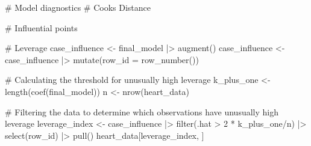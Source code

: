 \documentclass[
  letterpaper,
  DIV=11,
  numbers=noendperiod]{scrartcl}
\newenvironment{Shaded}{\begin{snugshade}}{\end{snugshade}}
\newcommand{\AttributeTok}[1]{\textcolor[rgb]{0.40,0.45,0.13}{#1}}
\newcommand{\CommentTok}[1]{\textcolor[rgb]{0.37,0.37,0.37}{#1}}
\newcommand{\DecValTok}[1]{\textcolor[rgb]{0.68,0.00,0.00}{#1}}
\newcommand{\FunctionTok}[1]{\textcolor[rgb]{0.28,0.35,0.67}{#1}}
\newcommand{\NormalTok}[1]{\textcolor[rgb]{0.00,0.23,0.31}{#1}}
\newcommand{\OtherTok}[1]{\textcolor[rgb]{0.00,0.23,0.31}{#1}}
\newcommand{\SpecialCharTok}[1]{\textcolor[rgb]{0.37,0.37,0.37}{#1}}
\begin{document}
\begin{Shaded}
\begin{Highlighting}[]
\CommentTok{\# Model diagnostics}
\CommentTok{\# Cooks Distance}


\CommentTok{\# Influential points}

\CommentTok{\# Leverage}
\NormalTok{case\_influence }\OtherTok{\textless{}{-}}\NormalTok{ final\_model }\SpecialCharTok{|\textgreater{}} \FunctionTok{augment}\NormalTok{()}
\NormalTok{case\_influence }\OtherTok{\textless{}{-}}\NormalTok{ case\_influence }\SpecialCharTok{|\textgreater{}} \FunctionTok{mutate}\NormalTok{(}\AttributeTok{row\_id =} \FunctionTok{row\_number}\NormalTok{())}

\CommentTok{\# Calculating the threshold for unusually high leverage}
\NormalTok{k\_plus\_one }\OtherTok{\textless{}{-}} \FunctionTok{length}\NormalTok{(}\FunctionTok{coef}\NormalTok{(final\_model))}
\NormalTok{n }\OtherTok{\textless{}{-}} \FunctionTok{nrow}\NormalTok{(heart\_data)}

\CommentTok{\# Filtering the data to determine which observations have unusually high leverage}
\NormalTok{leverage\_index }\OtherTok{\textless{}{-}}\NormalTok{ case\_influence }\SpecialCharTok{|\textgreater{}} \FunctionTok{filter}\NormalTok{(.hat }\SpecialCharTok{\textgreater{}} \DecValTok{2} \SpecialCharTok{*}\NormalTok{ k\_plus\_one}\SpecialCharTok{/}\NormalTok{n) }\SpecialCharTok{|\textgreater{}} \FunctionTok{select}\NormalTok{(row\_id) }\SpecialCharTok{|\textgreater{}} \FunctionTok{pull}\NormalTok{()}
\NormalTok{heart\_data[leverage\_index, ]}
\end{Highlighting}
\end{Shaded}
\end{document}
